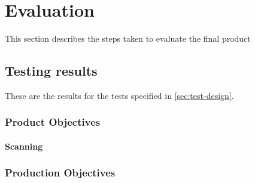 \chapter{Evaluation}
\label{cha:evaluation}
This section describes the steps taken to evaluate the final product

\section{Testing results}
These are the results for the tests specified in \ref{sec:test-design}.
\subsection{Product Objectives}
\subsubsection{Scanning}
\subsection{Production Objectives}


